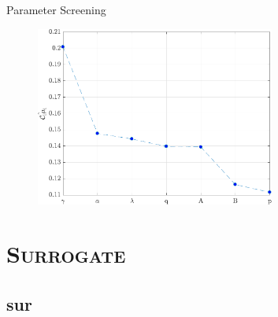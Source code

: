 \documentclass[xcolor={x11names,table},compress,svgnames,mathserif]{beamer}
\renewcommand{\(}{\begin{columns}}
\renewcommand{\)}{\end{columns}}
\newcommand{\<}[1]{\begin{column}{#1}}
\renewcommand{\>}{\end{column}}
\begin{document}
\begin{frame}{Parameter Screening}

\begin{center}
\begin{figure}[htbp]
  \includegraphics[width=0.7\textwidth]{./Figures/ub}
  \end{figure}
\end{center}

\end{frame}


\section{\scshape Surrogate}
\subsection{sur}
\end{document}
